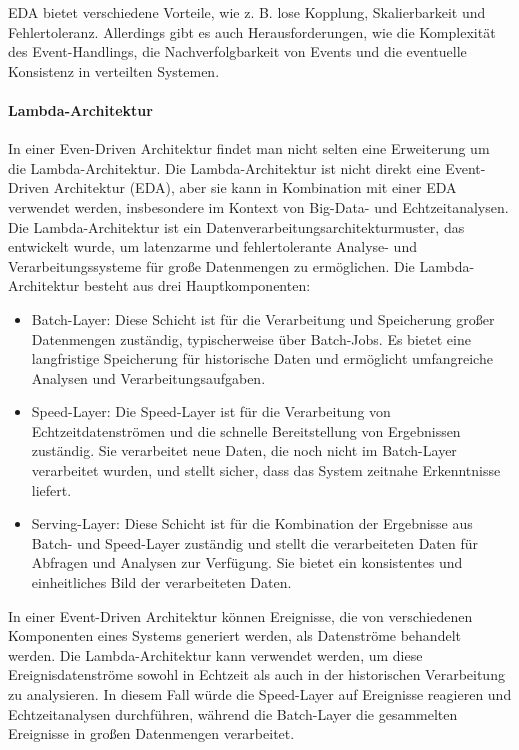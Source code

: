 EDA bietet verschiedene Vorteile, wie z. B. lose Kopplung, Skalierbarkeit und Fehlertoleranz. Allerdings gibt es auch Herausforderungen, wie die Komplexität des Event-Handlings, die Nachverfolgbarkeit von Events und die eventuelle Konsistenz in verteilten Systemen.

\paragraph{Lambda-Architektur}
In einer Even-Driven Architektur findet man nicht selten eine Erweiterung um die Lambda-Architektur.
Die Lambda-Architektur ist nicht direkt eine Event-Driven Architektur (EDA), aber sie kann in Kombination mit einer EDA verwendet werden, insbesondere im Kontext von Big-Data- und Echtzeitanalysen. Die Lambda-Architektur ist ein Datenverarbeitungsarchitekturmuster, das entwickelt wurde, um latenzarme und fehlertolerante Analyse- und Verarbeitungssysteme für große Datenmengen zu ermöglichen. Die Lambda-Architektur besteht aus drei Hauptkomponenten:
\begin{itemize}
\item Batch-Layer: Diese Schicht ist für die Verarbeitung und Speicherung großer Datenmengen zuständig, typischerweise über Batch-Jobs. Es bietet eine langfristige Speicherung für historische Daten und ermöglicht umfangreiche Analysen und Verarbeitungsaufgaben.

\item Speed-Layer: Die Speed-Layer ist für die Verarbeitung von Echtzeitdatenströmen und die schnelle Bereitstellung von Ergebnissen zuständig. Sie verarbeitet neue Daten, die noch nicht im Batch-Layer verarbeitet wurden, und stellt sicher, dass das System zeitnahe Erkenntnisse liefert.

\item Serving-Layer: Diese Schicht ist für die Kombination der Ergebnisse aus Batch- und Speed-Layer zuständig und stellt die verarbeiteten Daten für Abfragen und Analysen zur Verfügung. Sie bietet ein konsistentes und einheitliches Bild der verarbeiteten Daten.
\end{itemize}
In einer Event-Driven Architektur können Ereignisse, die von verschiedenen Komponenten eines Systems generiert werden, als Datenströme behandelt werden. Die Lambda-Architektur kann verwendet werden, um diese Ereignisdatenströme sowohl in Echtzeit als auch in der historischen Verarbeitung zu analysieren. In diesem Fall würde die Speed-Layer auf Ereignisse reagieren und Echtzeitanalysen durchführen, während die Batch-Layer die gesammelten Ereignisse in großen Datenmengen verarbeitet.

